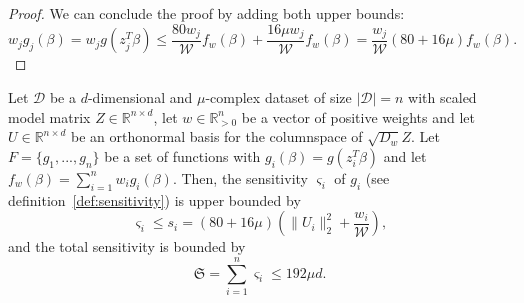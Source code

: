 \begin{proof}
    We can conclude the proof by adding both upper bounds:
    \begin{equation*}
        w_j g_j(\beta)
        = w_j g(z_j^T \beta) \leq \frac{80 w_j}{\mathcal{W}} f_w(\beta)
        + \frac{16 \mu w_j}{\mathcal{W}} f_w(\beta)
        = \frac{w_j}{\mathcal{W}} (80 + 16 \mu) f_w(\beta).
    \end{equation*}
\end{proof}

\begin{lemma}
    Let $\mathcal{D}$ be a $d$-dimensional and $\mu$-complex dataset of size
    $|\mathcal{D}|=n$ with scaled model matrix
    $Z \in \mathbb{R}^{n \times d}$, let $w \in \mathbb{R}^n_{>0}$
    be a vector of positive weights and let
    $U \in \mathbb{R}^{n \times d }$ be an orthonormal basis for
    the columnspace of $\sqrt{D_w}Z$.
    Let $F = \{g_1, ..., g_n\}$ be a set of functions with
    $g_i(\beta) = g(z_i^T \beta)$ and let
    $f_w(\beta) = \sum_{i=1}^n w_ig_i(\beta)$.
    Then, the sensitivity $\varsigma_i$ of $g_i$
    (see definition~\ref{def:sensitivity}) is upper bounded by
    \begin{equation*}
        \varsigma_i \leq s_i
        = (80 + 16\mu)(\lVert U_i \rVert_2^2 + \frac{w_i}{\mathcal{W}}),
    \end{equation*}
    and the total sensitivity is bounded by
    \begin{equation*}
        \mathfrak{S} = \sum_{i=1}^n \varsigma_i \leq 192 \mu d.
    \end{equation*}
\end{lemma}
